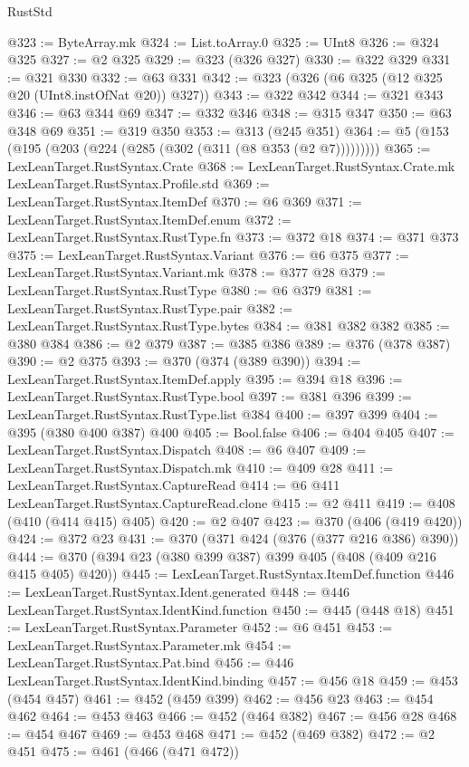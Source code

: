\begin{lexlean}{RustStd}
\begin{coremodule}
@323 := ByteArray.mk
@324 := List.toArray.{0}
@325 := UInt8
@326 := @324 @325
@327 := @2 @325
@329 := @323 (@326 @327)
@330 := @322 @329
@331 := @321 @330
@332 := @63 @331
@342 := @323 (@326 (@6 @325 (@12 @325 @20 (UInt8.instOfNat @20)) @327))
@343 := @322 @342
@344 := @321 @343
@346 := @63 @344 @69
@347 := @332 @346
@348 := @315 @347
@350 := @63 @348 @69
@351 := @319 @350
@353 := @313 (@245 @351)
@364 := @5 (@153 (@195 (@203 (@224 (@285 (@302 (@311 (@8 @353 (@2 @7)))))))))
@365 := LexLeanTarget.RustSyntax.Crate
@368 := LexLeanTarget.RustSyntax.Crate.mk LexLeanTarget.RustSyntax.Profile.std
@369 := LexLeanTarget.RustSyntax.ItemDef
@370 := @6 @369
@371 := LexLeanTarget.RustSyntax.ItemDef.enum
@372 := LexLeanTarget.RustSyntax.RustType.fn
@373 := @372 @18
@374 := @371 @373
@375 := LexLeanTarget.RustSyntax.Variant
@376 := @6 @375
@377 := LexLeanTarget.RustSyntax.Variant.mk
@378 := @377 @28
@379 := LexLeanTarget.RustSyntax.RustType
@380 := @6 @379
@381 := LexLeanTarget.RustSyntax.RustType.pair
@382 := LexLeanTarget.RustSyntax.RustType.bytes
@384 := @381 @382 @382
@385 := @380 @384
@386 := @2 @379
@387 := @385 @386
@389 := @376 (@378 @387)
@390 := @2 @375
@393 := @370 (@374 (@389 @390))
@394 := LexLeanTarget.RustSyntax.ItemDef.apply
@395 := @394 @18
@396 := LexLeanTarget.RustSyntax.RustType.bool
@397 := @381 @396
@399 := LexLeanTarget.RustSyntax.RustType.list @384
@400 := @397 @399
@404 := @395 (@380 @400 @387) @400
@405 := Bool.false
@406 := @404 @405
@407 := LexLeanTarget.RustSyntax.Dispatch
@408 := @6 @407
@409 := LexLeanTarget.RustSyntax.Dispatch.mk
@410 := @409 @28
@411 := LexLeanTarget.RustSyntax.CaptureRead
@414 := @6 @411 LexLeanTarget.RustSyntax.CaptureRead.clone
@415 := @2 @411
@419 := @408 (@410 (@414 @415) @405)
@420 := @2 @407
@423 := @370 (@406 (@419 @420))
@424 := @372 @23
@431 := @370 (@371 @424 (@376 (@377 @216 @386) @390))
@444 := @370 (@394 @23 (@380 @399 @387) @399 @405 (@408 (@409 @216 @415 @405) @420))
@445 := LexLeanTarget.RustSyntax.ItemDef.function
@446 := LexLeanTarget.RustSyntax.Ident.generated
@448 := @446 LexLeanTarget.RustSyntax.IdentKind.function
@450 := @445 (@448 @18)
@451 := LexLeanTarget.RustSyntax.Parameter
@452 := @6 @451
@453 := LexLeanTarget.RustSyntax.Parameter.mk
@454 := LexLeanTarget.RustSyntax.Pat.bind
@456 := @446 LexLeanTarget.RustSyntax.IdentKind.binding
@457 := @456 @18
@459 := @453 (@454 @457)
@461 := @452 (@459 @399)
@462 := @456 @23
@463 := @454 @462
@464 := @453 @463
@466 := @452 (@464 @382)
@467 := @456 @28
@468 := @454 @467
@469 := @453 @468
@471 := @452 (@469 @382)
@472 := @2 @451
@475 := @461 (@466 (@471 @472))

\end{coremodule}
\end{lexlean}

